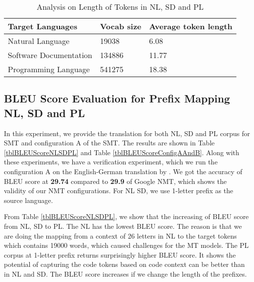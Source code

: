 \begin{table}[]
\small
\begin{tabular}{|l|l|l|}
\hline
\textbf{Target Languages}                                & \textbf{Vocab size}                                                    & \textbf{Average token length}                                                              \\ \hline
Natural Language                                & 19038                                                   & 6.08                                                              \\ \hline
Software Documentation                          & 134886                                                  & 11.77                                                             \\ \hline
Programming Language                            & 541275                                                  & 18.38                                                             \\ \hline
\end{tabular}
\caption{Analysis on Length of Tokens in NL, SD and PL}
\label{tblAnalyzeOnPrefixLength}
\end{table}

\subsection{BLEU Score Evaluation for Prefix Mapping NL, SD and PL}
In this experiment, we provide the translation for both NL, SD and PL corpus for SMT and configuration A of the SMT. The results are shown in Table \ref{tblBLEUScoreNLSDPL} and Table \ref{tblBLEUScoreConfigAAndB}. Along with these experiments, we have a verification experiment, which we run the configuration A on the English-German translation by \cite{040}. We got the accuracy of BLEU score at \textbf{29.74} compared to \textbf{29.9} of Google NMT, which shows the validity of our NMT configurations. For NL SD, we use 1-letter prefix as the source language.

From Table \ref{tblBLEUScoreNLSDPL}, we show that the increasing of BLEU score from NL, SD to PL. The NL has the lowest BLEU score. The reason is that we are doing the mapping from a context of 26 letters in NL to the target tokens which contains 19000 words, which caused challenges for the MT models. The PL corpus at 1-letter prefix returns surprisingly higher BLEU score. It shows the potential of capturing the code tokens based on code context can be better than in NL and SD. The BLEU score increases if we change the length of the prefixes.

